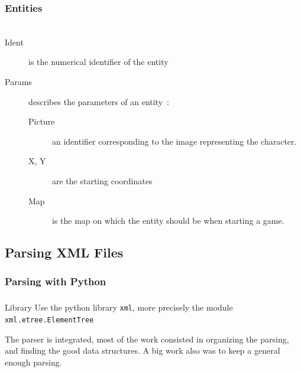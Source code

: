 \documentclass[11pt]{beamer}
\begin{document}
\subsubsection{Entities}

\begin{frame}
    \frametitle{\subsecname}
    \begin{figure}
        \begin{adjustwidth}{0.1\textwidth}{}
            \scriptsize{\inputminted{xml}{test_files/entity.xml}}
        \end{adjustwidth}
    \end{figure}
    \begin{small}
        \begin{adjustwidth}{-0.1\textwidth}{}
            \begin{description}
                \item[Ident] is the numerical identifier of the entity
                \item[Params] describes the parameters of an entity~:
                    \begin{description}
                        \item[Picture] an identifier corresponding to the image
                            representing the character.
                        \item[X, Y] are the starting coordinates
                        \item[Map] is the map on which the entity should be
                            when starting a game.
                    \end{description}
            \end{description}
        \end{adjustwidth}
    \end{small}
\end{frame}

\subsection{Parsing XML Files}

\subsubsection{Parsing with Python}

\begin{frame}[fragile]
    \frametitle{\subsecname}
    \begin{block}{Library}
        Use the python library \verb|xml|, more precisely
        the module \verb|xml.etree.ElementTree|
    \end{block}
    The parser is integrated, most of the work consisted in organizing
    the parsing, and finding the good data structures.
    A big work also was to keep a general enough parsing.
\end{frame}
\end{document}
